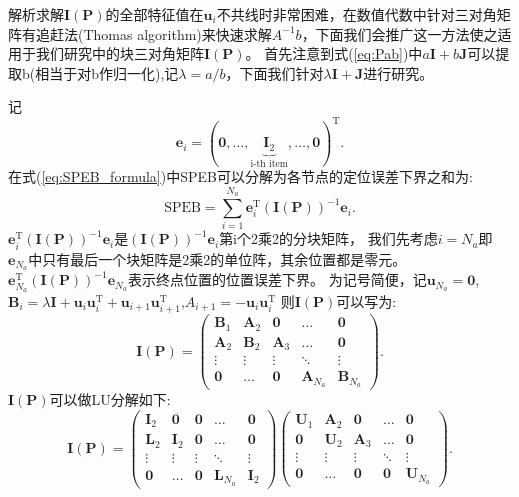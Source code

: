 解析求解$\bm{I}(\bm{P})$的全部特征值在$\bm{u}_i$不共线时非常困难，在数值代数中针对三对角矩阵有追赶法(Thomas algorithm)来快速求解$A^{-1}b$\cite{numericalAnalysis}，下面我们会推广这一方法使之适用于我们研究中的块三对角矩阵$\bm{I}(\bm{P})$。
首先注意到式(\ref{eq:Pab})中$a\bm{I}+b\bm{J}$可以提取b(相当于对b作归一化),记$\lambda=a/b$，下面我们针对$\lambda \bm{I}+\bm{J}$进行研究。

记
\begin{equation}
\bm{e}_i=(\bm{0},\dots,\underbrace{\bm{I}_2}_{\text{i-th item}},\dots,\bm{0})^{\textrm{T}}.
\end{equation}
在式(\ref{eq:SPEB_formula})中SPEB可以分解为各节点的定位误差下界之和为:
\begin{equation}\label{eq:SPEB_every_node}
  \text{SPEB}=\sum_{i=1}^{N_a} \bm{e}_i^{\textrm{T}}(\bm{I}(\bm{P}))^{-1}\bm{e}_i.
\end{equation}
$\bm{e}_i^{\textrm{T}}(\bm{I}(\bm{P}))^{-1}\bm{e}_i$是$(\bm{I}(\bm{P}))^{-1}\bm{e}_i$第i个2乘2的分块矩阵，
我们先考虑$i=N_a$即$\bm{e}_{N_a}$中只有最后一个块矩阵是2乘2的单位阵，其余位置都是零元。
$\bm{e}_{N_a}^{\textrm{T}}(\bm{I}(\bm{P}))^{-1}\bm{e}_{N_a}$表示终点位置的位置误差下界。
为记号简便，记$\bm{u}_{N_a}=\bm{0}$,$\bm{B}_i=\lambda\bm{I}+\bm{u}_i\bm{u}_i^{\textrm{T}}+\bm{u}_{i+1}\bm{u}_{i+1}^{\textrm{T}}$,$A_{i+1}=-\bm{u}_i\bm{u}_i^{\textrm{T}}$
则$\bm{I}(\bm{P})$可以写为:
\begin{equation}
\bm{I}(\bm{P})=\begin{pmatrix}
                 \bm{B}_1 & \bm{A}_2 & \bm{0} & \dots & \bm{0} \\
                 \bm{A}_2 & \bm{B}_2 & \bm{A}_3 & \dots & \bm{0} \\
                 \vdots & \vdots & \vdots & \ddots & \vdots \\
                 \bm{0} & \dots & \bm{0} & \bm{A}_{N_a} & \bm{B}_{N_a}
               \end{pmatrix}.
\end{equation}
$\bm{I}(\bm{P})$可以做LU分解如下:
\begin{equation}\label{eq:LU}
  \bm{I}(\bm{P})=\begin{pmatrix}
                 \bm{I}_2 & \bm{0} & \bm{0} & \dots & \bm{0} \\
                 \bm{L}_2 & \bm{I}_2 & \bm{0} & \dots & \bm{0} \\
                 \vdots & \vdots & \vdots & \ddots & \vdots \\
                 \bm{0} & \dots & \bm{0} & \bm{L}_{N_a} & \bm{I}_{2}
               \end{pmatrix}\begin{pmatrix}
                 \bm{U}_1 & \bm{A}_2 & \bm{0} & \dots & \bm{0} \\
                 \bm{0} & \bm{U}_2 & \bm{A}_3 & \dots & \bm{0} \\
                 \vdots & \vdots & \vdots & \ddots & \vdots \\
                 \bm{0} & \dots & \bm{0} & \bm{0} & \bm{U}_{N_a}
               \end{pmatrix}.
\end{equation}
